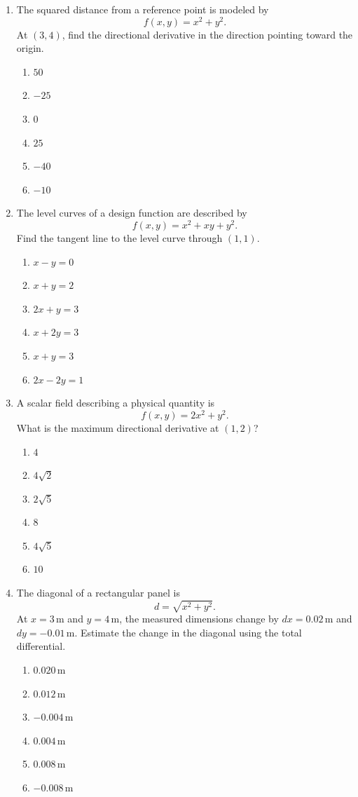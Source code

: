 \documentclass[a4paper,12pt]{article}
\theoremstyle{mystyle}
\numberwithin{equation}{section}
\numberwithin{theorem}{section}
\numberwithin{proposition}{section}
\numberwithin{example}{section}
\numberwithin{remark}{section}
\numberwithin{lemma}{section}
\numberwithin{corollary}{section}
\numberwithin{definition}{section}
\begin{document}
\begin{enumerate}
\item The squared distance from a reference point is modeled by
\[
    f(x,y)=x^2+y^2.
\]
At $(3,4)$, find the directional derivative in the direction
pointing toward the origin.
\begin{enumerate}
    \item $50$
    \item $-25$
    \item $0$
    \item $25$
    \item $-40$
    \item $-10$
\end{enumerate}

\item The level curves of a design function are described by
\[
    f(x,y)=x^2+xy+y^2.
\]
Find the tangent line to the level curve through $(1,1)$.
\begin{enumerate}
    \item $x-y=0$
    \item $x+y=2$
    \item $2x+y=3$
    \item $x+2y=3$
    \item $x+y=3$
    \item $2x-2y=1$
\end{enumerate}

\item A scalar field describing a physical quantity is
\[
    f(x,y)=2x^2+y^2.
\]
What is the maximum directional derivative at $(1,2)$?
\begin{enumerate}
    \item $4$
    \item $4\sqrt{2}$
    \item $2\sqrt{5}$
    \item $8$
    \item $4\sqrt{5}$
    \item $10$
\end{enumerate}

\item The diagonal of a rectangular panel is
\[
    d=\sqrt{x^2+y^2}.
\]
At $x=3\,\mathrm{m}$ and $y=4\,\mathrm{m}$, the measured dimensions
change by $dx=0.02\,\mathrm{m}$ and $dy=-0.01\,\mathrm{m}$.
Estimate the change in the diagonal using the total differential.
\begin{enumerate}
    \item $0.020\,\mathrm{m}$
    \item $0.012\,\mathrm{m}$
    \item $-0.004\,\mathrm{m}$
    \item $0.004\,\mathrm{m}$
    \item $0.008\,\mathrm{m}$
    \item $-0.008\,\mathrm{m}$
\end{enumerate}


\end{enumerate}
\end{document}
